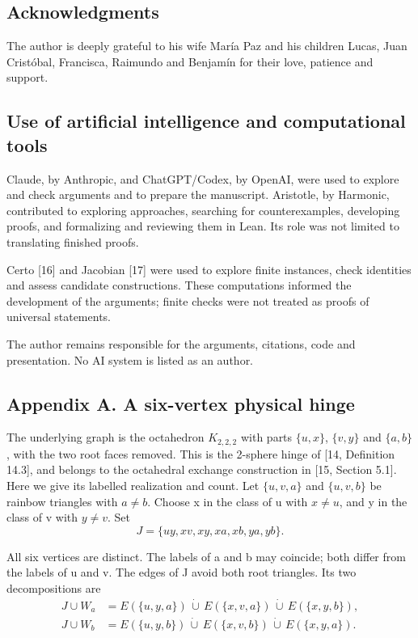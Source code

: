 \documentclass[english,11pt,a4paper]{article}
\begin{document}
\subsection{Acknowledgments}\label{acknowledgments}

The author is deeply grateful to his wife María Paz and his children Lucas, Juan Cristóbal, Francisca, Raimundo and Benjamín for their love, patience and support.

\subsection{Use of artificial intelligence and computational tools}\label{use-of-artificial-intelligence-and-computational-tools}

Claude, by Anthropic, and ChatGPT/Codex, by OpenAI, were used to explore and check arguments and to prepare the manuscript. Aristotle, by Harmonic, contributed to exploring approaches, searching for counterexamples, developing proofs, and formalizing and reviewing them in Lean. Its role was not limited to translating finished proofs.

Certo {[}16{]} and Jacobian {[}17{]} were used to explore finite instances, check identities and assess candidate constructions. These computations informed the development of the arguments; finite checks were not treated as proofs of universal statements.

The author remains responsible for the arguments, citations, code and presentation. No AI system is listed as an author.

\subsection{Appendix A. A six-vertex physical hinge}\label{appendix-a.-a-six-vertex-physical-hinge}

The underlying graph is the octahedron \(K_{2,2,2}\) with parts \(\{u,x\}\), \(\{v,y\}\) and \(\{a,b\}\), with the two root faces removed. This is the 2-sphere hinge of {[}14, Definition 14.3{]}, and belongs to the octahedral exchange construction in {[}15, Section 5.1{]}. Here we give its labelled realization and count. Let \(\{u,v,a\}\) and \(\{u,v,b\}\) be rainbow triangles with \(a\ne b\). Choose x in the class of u with \(x\ne u\), and y in the class of v with \(y\ne v\). Set
\[J=\{uy,xv,xy,xa,xb,ya,yb\}.                                       \tag{A.1}\]

All six vertices are distinct. The labels of a and b may coincide; both differ from the labels of u and v. The edges of J avoid both root triangles. Its two decompositions are
\[\begin{aligned}
J\cup W_a&=E(\{u,y,a\})\,\dot\cup\,
 E(\{x,v,a\})\,\dot\cup\,E(\{x,y,b\}),\\
J\cup W_b&=E(\{u,y,b\})\,\dot\cup\,
 E(\{x,v,b\})\,\dot\cup\,E(\{x,y,a\}).
\end{aligned}                                                       \tag{A.2}\]
\end{document}
